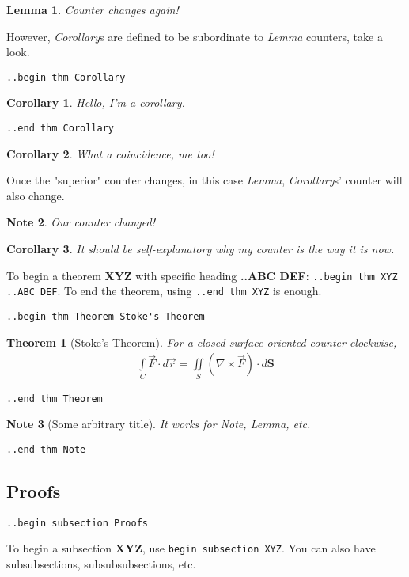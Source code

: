 \documentclass[12pt]{article}
\newtheorem*{Theorem}{Theorem}
\newtheorem{Lemma}{Lemma}
\newtheorem{Corollary}{Corollary}[Lemma]
\newtheorem{Note}[Lemma]{Note}
\begin{document}
\begin{flushleft}
\begin{Lemma}
Counter changes again!
\end{Lemma}

However, \emph{Corollary}s are defined to be subordinate to \emph{Lemma} counters, take a look.

\medskip
\verb|..begin thm Corollary|
\begin{Corollary}
Hello, I'm a corollary.
\end{Corollary}
\verb|..end thm Corollary|
\medskip

\begin{Corollary}
What a coincidence, me too!
\end{Corollary}

Once the "superior" counter changes, in this case \emph{Lemma}, \emph{Corollary}s' counter will also change.

\begin{Note}
Our counter changed!
\end{Note}

\begin{Corollary}
It should be self-explanatory why my counter is the way it is now.
\end{Corollary}

\bigskip
To begin a theorem \textbf{XYZ} with specific heading \textbf{..ABC DEF}: \verb|..begin thm XYZ ..ABC DEF|. To end the theorem, using \verb|..end thm XYZ| is enough.

\medskip
\verb|..begin thm Theorem Stoke's Theorem|
\begin{Theorem}[Stoke's Theorem]
For a closed surface oriented counter-clockwise,
\begin{gather*}
\int\limits_C \vec{F} \cdot d\vec{r} = \iint\limits_S (\nabla \times \vec{F}) \cdot d\textbf{S} 
\end{gather*}
\end{Theorem}
\verb|..end thm Theorem|
\medskip

\begin{Note}[Some arbitrary title]
It works for \emph{Note}, \emph{Lemma}, etc.
\end{Note}
\verb|..end thm Note|

\subsection{Proofs}
\verb|..begin subsection Proofs|

To begin a subsection \textbf{XYZ}, use \verb|begin subsection XYZ|. You can also have subsubsections, subsubsubsections, etc.


\end{flushleft}
\end{document}
